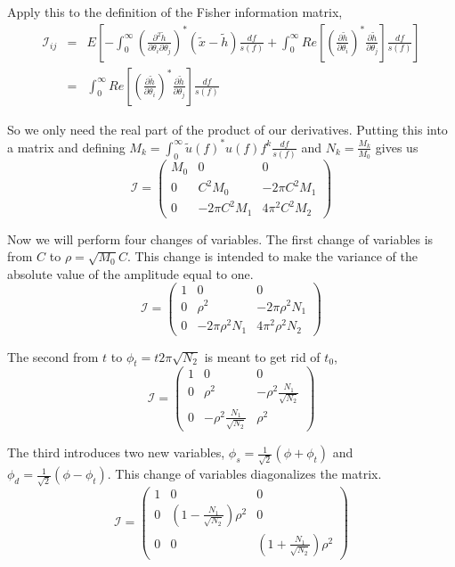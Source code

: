 \documentclass{iopart}
\begin{document}
Apply this to the definition of the Fisher information matrix,
\begin{eqnarray}
	\mathcal{I}_{ij} & = & E[-\int_0^\infty (\frac{\partial ^2 \tilde{h}}{\partial \theta_i \partial \theta_j})^*(\tilde{x} - \tilde{h})\frac{df}{s(f)} + \int_0 ^ \infty Re[(\frac{\partial \tilde{h}}{\partial \theta_i})^*\frac{\partial \tilde{h}}{\partial \theta _j}]\frac{df}{s(f)}] \\
	& = & \int^\infty _0 Re[(\frac{\partial \tilde{h}}{\partial \theta_i})^* \frac{\partial \tilde{h}}{\partial \theta _j}]\frac{df}{s(f)}
\end{eqnarray}

So we only need the real part of the product of our derivatives. Putting this into a matrix and defining $M_k = \int_0^\infty \tilde{u}(f)^* u(f) f^k\frac{df}{s(f)}$ and $N_k = \frac{M_k}{M_0}$ gives us
\[
\mathcal{I} =
\left( {\begin{array}{ccc}
 M_0 & 0 & 0 \\
 0 & C^2M_0 & -2\pi C^2M_1 \\
 0 & -2\pi C^2M_1 & 4\pi^2C^2M_2
 \end{array} } \right)
\]

Now we will perform four changes of variables. The first change of variables is from $C$ to $\rho = \sqrt{M_0}C$. This change is intended to make the variance of the absolute value of the amplitude equal to one. 
\[
\mathcal{I} =
\left( {\begin{array}{ccc}
 1 & 0 & 0 \\
 0 & \rho^2 & -2\pi\rho^2 N_1 \\
 0 & -2\pi\rho^2 N_1 & 4\pi^2 \rho^2 N_2
 \end{array} } \right)
\]

The second from $t$ to $\phi_t = t2\pi \sqrt{N_2}$ is meant to get rid of $t_0$,
\[
\mathcal{I} =
\left( {\begin{array}{ccc}
 1 & 0 & 0 \\
 0 & \rho^2 & -\rho^2\frac{N_1}{\sqrt{N_2}} \\
 0 & -\rho^2\frac{N_1}{\sqrt{N_2}} & \rho^2
 \end{array} } \right)
\]

The third introduces two new variables, $\phi_s = \frac{1}{\sqrt{2}}(\phi + \phi_t)$ and $\phi_d = \frac{1}{\sqrt{2}}(\phi - \phi_t)$. This change of variables diagonalizes the matrix.
\[
\mathcal{I} =
\left( {\begin{array}{ccc}
 1 & 0 & 0 \\
 0 & (1 - \frac{N_1}{\sqrt{N_2}})\rho^2 & 0 \\
 0 & 0 & (1 + \frac{N_1}{\sqrt{N_2}})\rho^2
 \end{array} } \right)
\]
\end{document}
